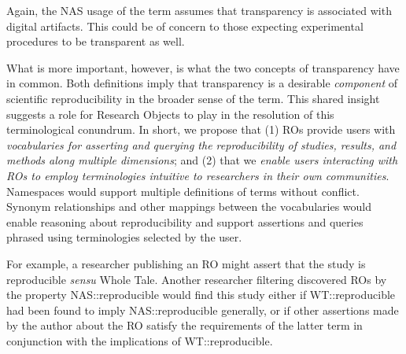 \noindent Again, the NAS usage of the term assumes that transparency is associated with digital artifacts.
This could be of concern to those expecting experimental procedures to be transparent as well.

What is more important, however, is what the two concepts of transparency have in common.
Both definitions imply that transparency is a desirable \emph{component} of scientific
    reproducibility in the broader sense of the term.
This shared insight suggests a role for Research Objects to play in the resolution of this
    terminological conundrum.
In short, we propose that (1) ROs provide users with \emph{vocabularies for asserting and
    querying the reproducibility of studies, results, and methods along multiple dimensions};
    and (2) that we \emph{enable users interacting with ROs to employ terminologies intuitive to
    researchers in their own communities}.
Namespaces would support multiple definitions of terms without conflict.
Synonym relationships and other mappings between the vocabularies would enable reasoning about
    reproducibility and support assertions and queries phrased using terminologies selected by
    the user.

For example, a researcher publishing an RO might assert that the study is reproducible \emph{sensu}
    \textsf{Whole Tale}.
Another researcher filtering discovered ROs by the property \textsf{NAS::reproducible} would
    find this study either if \textsf{WT::reproducible} had been found to imply
    \textsf{NAS::reproducible} generally, or if other assertions made by the author
    about the RO satisfy the requirements of the latter term in conjunction with the
    implications of \textsf{WT::reproducible}.

